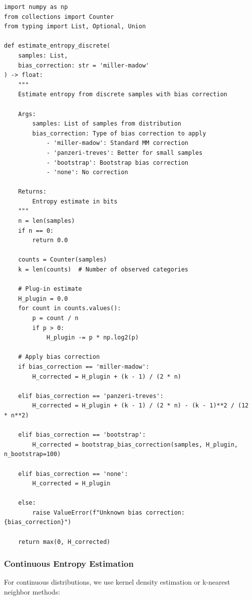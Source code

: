 \documentclass[10pt, letterpaper]{article}
\begin{document}
\begin{lstlisting}
import numpy as np
from collections import Counter
from typing import List, Optional, Union

def estimate_entropy_discrete(
    samples: List,
    bias_correction: str = 'miller-madow'
) -> float:
    """
    Estimate entropy from discrete samples with bias correction

    Args:
        samples: List of samples from distribution
        bias_correction: Type of bias correction to apply
            - 'miller-madow': Standard MM correction
            - 'panzeri-treves': Better for small samples
            - 'bootstrap': Bootstrap bias correction
            - 'none': No correction

    Returns:
        Entropy estimate in bits
    """
    n = len(samples)
    if n == 0:
        return 0.0

    counts = Counter(samples)
    k = len(counts)  # Number of observed categories

    # Plug-in estimate
    H_plugin = 0.0
    for count in counts.values():
        p = count / n
        if p > 0:
            H_plugin -= p * np.log2(p)

    # Apply bias correction
    if bias_correction == 'miller-madow':
        H_corrected = H_plugin + (k - 1) / (2 * n)

    elif bias_correction == 'panzeri-treves':
        H_corrected = H_plugin + (k - 1) / (2 * n) - (k - 1)**2 / (12 * n**2)

    elif bias_correction == 'bootstrap':
        H_corrected = bootstrap_bias_correction(samples, H_plugin, n_bootstrap=100)

    elif bias_correction == 'none':
        H_corrected = H_plugin

    else:
        raise ValueError(f"Unknown bias correction: {bias_correction}")

    return max(0, H_corrected)
\end{lstlisting}

\subsubsection{Continuous Entropy Estimation}

For continuous distributions, we use kernel density estimation or k-nearest neighbor methods:
\end{document}
